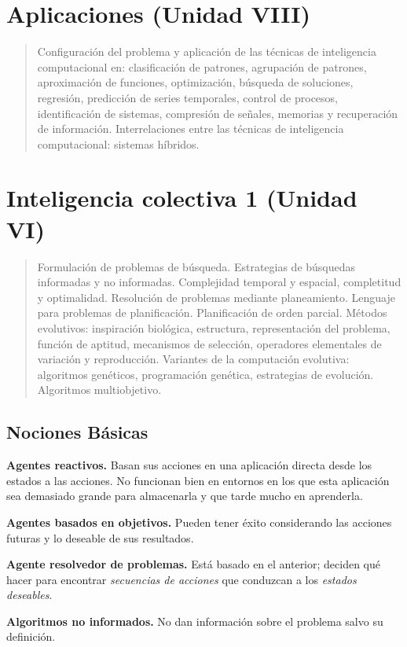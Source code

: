\documentclass[10pt,a4paper]{article}
\begin{document}
\section*{Aplicaciones (Unidad VIII)}
\begin{quote}
Configuración del problema y aplicación de las técnicas de inteligencia computacional en: clasificación de patrones, agrupación de patrones, aproximación de funciones, optimización, búsqueda de soluciones, regresión, predicción de series temporales, control de procesos, identificación de sistemas, compresión de señales, memorias y recuperación de información. Interrelaciones entre las técnicas de inteligencia computacional: sistemas híbridos.
\end{quote}

\pagebreak
\maketitle

\section{Inteligencia colectiva 1 (Unidad VI)}
\begin{quote}
Formulación de problemas de búsqueda. Estrategias de búsquedas informadas y no informadas. Complejidad temporal y espacial, completitud y optimalidad. Resolución de problemas mediante planeamiento. Lenguaje para problemas de planificación. Planificación de orden parcial. Métodos evolutivos: inspiración biológica, estructura, representación del problema, función de aptitud, mecanismos de selección, operadores elementales de variación y reproducción. Variantes de la computación evolutiva: algoritmos genéticos, programación genética, estrategias de evolución. Algoritmos multiobjetivo.
\end{quote}

\subsection{Nociones Básicas}
\begin{description}
\item \textbf{Agentes reactivos.} Basan sus acciones en una aplicación directa desde los estados a las acciones. No funcionan bien en entornos en los que esta aplicación sea demasiado grande para almacenarla y que tarde mucho en aprenderla.
\item \textbf{Agentes basados en objetivos.} Pueden tener éxito considerando las acciones futuras y lo deseable de sus resultados.
\item \textbf{Agente resolvedor de problemas.} Está basado en el anterior; deciden qué hacer para encontrar \textit{secuencias de acciones} que conduzcan a los \textit{estados deseables}.
\item \textbf{Algoritmos no informados.} No dan información sobre el problema salvo su definición.
\end{description}
\end{document}

